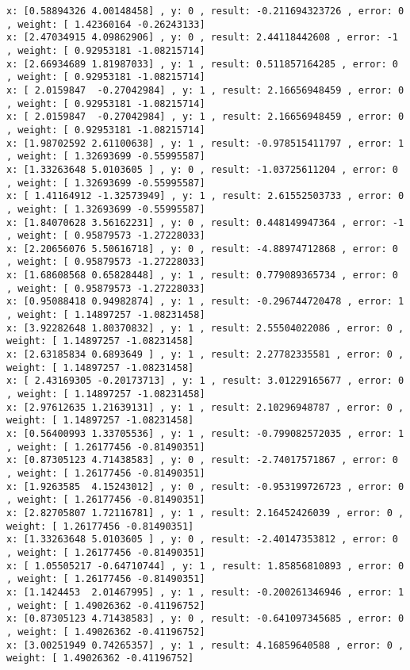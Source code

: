 \documentclass[11pt]{article}
\begin{document}
\begin{Verbatim}[commandchars=\\\{\}]
x: [0.58894326 4.00148458] , y: 0 , result: -0.211694323726 , error: 0 , weight: [ 1.42360164 -0.26243133]
x: [2.47034915 4.09862906] , y: 0 , result: 2.44118442608 , error: -1 , weight: [ 0.92953181 -1.08215714]
x: [2.66934689 1.81987033] , y: 1 , result: 0.511857164285 , error: 0 , weight: [ 0.92953181 -1.08215714]
x: [ 2.0159847  -0.27042984] , y: 1 , result: 2.16656948459 , error: 0 , weight: [ 0.92953181 -1.08215714]
x: [ 2.0159847  -0.27042984] , y: 1 , result: 2.16656948459 , error: 0 , weight: [ 0.92953181 -1.08215714]
x: [1.98702592 2.61100638] , y: 1 , result: -0.978515411797 , error: 1 , weight: [ 1.32693699 -0.55995587]
x: [1.33263648 5.0103605 ] , y: 0 , result: -1.03725611204 , error: 0 , weight: [ 1.32693699 -0.55995587]
x: [ 1.41164912 -1.32573949] , y: 1 , result: 2.61552503733 , error: 0 , weight: [ 1.32693699 -0.55995587]
x: [1.84070628 3.56162231] , y: 0 , result: 0.448149947364 , error: -1 , weight: [ 0.95879573 -1.27228033]
x: [2.20656076 5.50616718] , y: 0 , result: -4.88974712868 , error: 0 , weight: [ 0.95879573 -1.27228033]
x: [1.68608568 0.65828448] , y: 1 , result: 0.779089365734 , error: 0 , weight: [ 0.95879573 -1.27228033]
x: [0.95088418 0.94982874] , y: 1 , result: -0.296744720478 , error: 1 , weight: [ 1.14897257 -1.08231458]
x: [3.92282648 1.80370832] , y: 1 , result: 2.55504022086 , error: 0 , weight: [ 1.14897257 -1.08231458]
x: [2.63185834 0.6893649 ] , y: 1 , result: 2.27782335581 , error: 0 , weight: [ 1.14897257 -1.08231458]
x: [ 2.43169305 -0.20173713] , y: 1 , result: 3.01229165677 , error: 0 , weight: [ 1.14897257 -1.08231458]
x: [2.97612635 1.21639131] , y: 1 , result: 2.10296948787 , error: 0 , weight: [ 1.14897257 -1.08231458]
x: [0.56400993 1.33705536] , y: 1 , result: -0.799082572035 , error: 1 , weight: [ 1.26177456 -0.81490351]
x: [0.87305123 4.71438583] , y: 0 , result: -2.74017571867 , error: 0 , weight: [ 1.26177456 -0.81490351]
x: [1.9263585  4.15243012] , y: 0 , result: -0.953199726723 , error: 0 , weight: [ 1.26177456 -0.81490351]
x: [2.82705807 1.72116781] , y: 1 , result: 2.16452426039 , error: 0 , weight: [ 1.26177456 -0.81490351]
x: [1.33263648 5.0103605 ] , y: 0 , result: -2.40147353812 , error: 0 , weight: [ 1.26177456 -0.81490351]
x: [ 1.05505217 -0.64710744] , y: 1 , result: 1.85856810893 , error: 0 , weight: [ 1.26177456 -0.81490351]
x: [1.1424453  2.01467995] , y: 1 , result: -0.200261346946 , error: 1 , weight: [ 1.49026362 -0.41196752]
x: [0.87305123 4.71438583] , y: 0 , result: -0.641097345685 , error: 0 , weight: [ 1.49026362 -0.41196752]
x: [3.00251949 0.74265357] , y: 1 , result: 4.16859640588 , error: 0 , weight: [ 1.49026362 -0.41196752]

\end{Verbatim}
\end{document}
